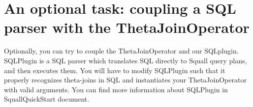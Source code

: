\documentclass[a4paper,10pt]{article}
\begin{document}


\section{An optional task: coupling a SQL parser with the ThetaJoinOperator}
\label{ch:Appendix}
\vspace{2mm}

Optionally, you can try to couple the ThetaJoinOperator and our SQLplugin. SQLPlugin is a SQL parser which translates SQL directly to Squall query plans, and then executes them. You will have to modify SQLPlugin such that it properly recognizes theta-joins in SQL and instantiates your ThetaJoinOperator with valid arguments. You can find more information about SQLPlugin in SquallQuickStart document.

{


}
\end{document}

